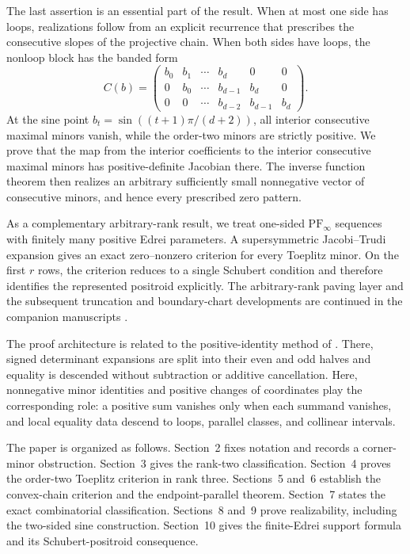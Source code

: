 \documentclass{amsart}
\numberwithin{equation}{section}
\theoremstyle{definition}
\theoremstyle{remark}
\newcommand{\PFinfty}{\mathrm{PF}_{\infty}}
\begin{document}
The last assertion is an essential part of the result.  When at most one side has loops, realizations follow from an explicit recurrence that prescribes the consecutive slopes of the projective chain.  When both sides have loops, the nonloop block has the banded form
\[
 C(b)=
 \begin{pmatrix}
 b_0&b_1&\cdots&b_d&0&0\\
 0&b_0&\cdots&b_{d-1}&b_d&0\\
 0&0&\cdots&b_{d-2}&b_{d-1}&b_d
 \end{pmatrix}.
\]
At the sine point $b_t=\sin((t+1)\pi/(d+2))$, all interior consecutive maximal minors vanish, while the order-two minors are strictly positive.  We prove that the map from the interior coefficients to the interior consecutive maximal minors has positive-definite Jacobian there.  The inverse function theorem then realizes an arbitrary sufficiently small nonnegative vector of consecutive minors, and hence every prescribed zero pattern.

As a complementary arbitrary-rank result, we treat one-sided $\PFinfty$ sequences with finitely many positive Edrei parameters.  A supersymmetric Jacobi--Trudi expansion gives an exact zero--nonzero criterion for every Toeplitz minor.  On the first $r$ rows, the criterion reduces to a single Schubert condition and therefore identifies the represented positroid explicitly.  The arbitrary-rank paving layer and the subsequent truncation and boundary-chart developments are continued in the companion manuscripts \cite{PaperB,PaperC}.

The proof architecture is related to the positive-identity method of \cite{GCQ}.  There, signed determinant expansions are split into their even and odd halves and equality is descended without subtraction or additive cancellation.  Here, nonnegative minor identities and positive changes of coordinates play the corresponding role: a positive sum vanishes only when each summand vanishes, and local equality data descend to loops, parallel classes, and collinear intervals.

The paper is organized as follows.  Section~2 fixes notation and records a corner-minor obstruction.  Section~3 gives the rank-two classification.  Section~4 proves the order-two Toeplitz criterion in rank three.  Sections~5 and~6 establish the convex-chain criterion and the endpoint-parallel theorem.  Section~7 states the exact combinatorial classification.  Sections~8 and~9 prove realizability, including the two-sided sine construction.  Section~10 gives the finite-Edrei support formula and its Schubert-positroid consequence.
\end{document}
